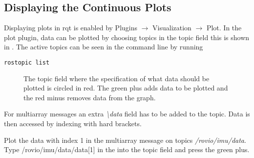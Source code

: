 \subsection{Displaying the Continuous Plots}
Displaying plots in rqt is enabled by Plugins $\rightarrow$ Visualization $\rightarrow$ Plot. In the plot plugin, data can be plotted by choosing topics in the topic field this is shown in . The active topics can be seen in the command line by running 
\begin{lstlisting}
rostopic list
\end{lstlisting}
\begin{figure}
\centering
{}
\caption{The topic field where the specification of what data should be plotted is circled in red. The green plus adds data to be plotted and the red minus removes data from the graph.}
\label{fig:contplot}
\end{figure}

For multiarray messages an extra \textit{\textbackslash data} field has to be added to the topic. Data is then accessed by indexing with hard brackets. 
\begin{example}
Plot the data with index 1 in the multiarray message on topics \textit{/rovio/imu/data}. Type /rovio/imu/data/data[1] in the into the topic field and press the green plus.  
\end{example}

